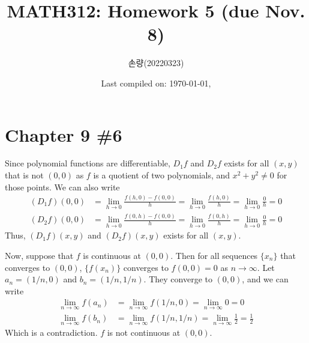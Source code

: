 \documentclass{scrartcl}
\title{MATH312: Homework 5 (due Nov. 8)}
\author{손량(20220323)}
\date{Last compiled on: \today, \currenttime}
\begin{document}
\maketitle

\section{Chapter 9 \#6}
Since polynomial functions are differentiable, \(D_1 f\) and \(D_2 f\) exists
for all \((x, y)\) that is not \((0, 0)\) as \(f\) is a quotient of two
polynomials, and \(x^2 + y^2 \not = 0\) for those points. We can also write
\begin{align*}
  (D_1 f) (0, 0)
  &= \lim_{h \to 0} \frac{f(h, 0) - f(0, 0)}{h}
  = \lim_{h \to 0} \frac{f(h, 0)}{h}
  = \lim_{h \to 0} \frac{0}{h}
  = 0 \\
  (D_2 f) (0, 0)
  &= \lim_{h \to 0} \frac{f(0, h) - f(0, 0)}{h}
  = \lim_{h \to 0} \frac{f(0, h)}{h}
  = \lim_{h \to 0} \frac{0}{h}
  = 0
\end{align*}
Thus, \((D_1 f) (x, y)\) and \((D_2 f) (x, y)\) exists for all \((x, y)\).

Now, suppose that \(f\) is continuous at \((0, 0)\). Then for all sequences
\(\{x_n\}\) that converges to \((0, 0)\), \(\{f(x_n)\}\) converges to \(f(0, 0)
= 0\) as \(n \to \infty\). Let \(a_n = (1 / n, 0)\) and \(b_n = (1 / n, 1 /
n)\). They converge to \((0, 0)\), and we can write
\begin{align*}
  \lim_{n \to \infty} f(a_n)
  &= \lim_{n \to \infty} f(1 / n, 0)
  = \lim_{n \to \infty} 0
  = 0 \\
  \lim_{n \to \infty} f(b_n)
  &= \lim_{n \to \infty} f(1 / n, 1 / n)
  = \lim_{n \to \infty} \frac{1}{2}
  = \frac{1}{2}
\end{align*}
Which is a contradiction. \(f\) is not continuous at \((0, 0)\).
\end{document}
